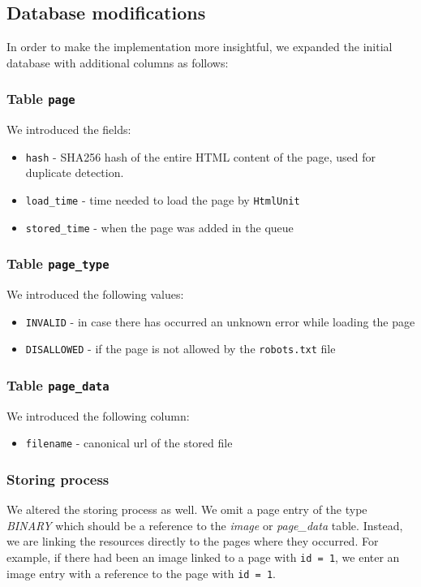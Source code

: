 \documentclass{article}
\begin{document}
\subsection{Database modifications}

In order to make the implementation more insightful, we expanded the initial database with additional columns as follows:
\subsubsection{Table \texttt{page}}
We introduced the fields:
\begin{itemize}
    \item \texttt{hash} - SHA256 hash of the entire HTML content of the page, used for duplicate detection.
    \item \texttt{load\_time} - time needed to load the page by \texttt{HtmlUnit}
    \item \texttt{stored\_time} - when the page was added in the queue
\end{itemize}
\subsubsection{Table \texttt{page\_type}}
We introduced the following values:
\begin{itemize}
    \item \texttt{INVALID} - in case there has occurred an unknown error while loading the page
    \item \texttt{DISALLOWED} - if the page is not allowed by the \texttt{robots.txt} file
\end{itemize}

\subsubsection{Table \texttt{page\_data}}
We introduced the following column:
\begin{itemize}
    \item \texttt{filename} - canonical url of the stored file
\end{itemize}

\subsubsection{Storing process}

We altered the storing process as well. We omit a page entry of the type \textit{BINARY} which should be a reference to the \textit{image} or \textit{page\_data} table. Instead, we are linking the resources directly to the pages where they occurred. For example, if there had been an image linked to a page with \texttt{id = 1}, we enter an image entry with a reference to the page with \texttt{id = 1}.
\end{document}
